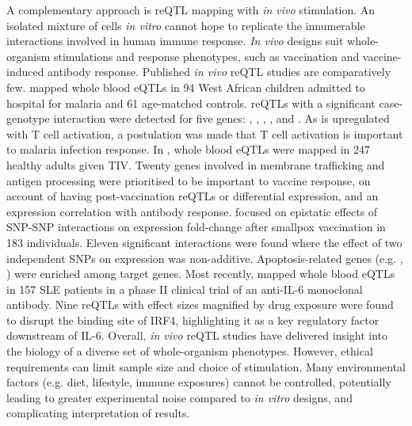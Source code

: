 A complementary approach is \gls{reQTL} mapping with \textit{in vivo} stimulation.
An isolated mixture of cells \textit{in vitro} cannot hope to replicate the innumerable interactions involved in human immune response.
\textit{In vivo} designs suit whole-organism stimulations and response phenotypes,
such as vaccination and vaccine-induced antibody response.
%
Published \textit{in vivo} \gls{reQTL} studies are comparatively few.
\textcite{idaghdour2012EvidenceAdditiveInteraction} mapped whole blood \glspl{eQTL} in 94 West African children admitted to hospital for malaria and 61 age-matched controls.
\glspl{reQTL} with a significant case-genotype interaction were detected for five genes:
, , , , and .
As  is upregulated with T cell activation, a postulation was made that T cell activation is important to malaria infection response.
In \textcite{franco2013IntegrativeGenomicAnalysis}, whole blood \glspl{eQTL} were mapped in 247 healthy adults given \gls{TIV}.
Twenty genes involved in membrane trafficking and antigen processing were prioritised to be important to vaccine response,
on account of having post-vaccination \glspl{reQTL} or differential expression, and an expression correlation with antibody response.
\textcite{lareau2016InteractionQuantitativeTrait} focused on epistatic effects of \gls{SNP}-\gls{SNP} interactions on expression fold-change after smallpox vaccination in 183 individuals.
Eleven significant interactions were found where the effect of two independent \glspl{SNP} on expression was non-additive.
Apoptosis-related genes (e.g. , ) were enriched among target genes.
Most recently, \textcite{davenport2018DiscoveringVivoCytokineeQTL}
mapped whole blood \glspl{eQTL} in 157 \gls{SLE} patients in a phase II clinical trial of an anti-IL-6 monoclonal antibody.
Nine \glspl{reQTL} with effect sizes magnified by drug exposure were found to disrupt the binding site of IRF4,
highlighting it as a key regulatory factor downstream of IL-6.
%
Overall, \textit{in vivo} \gls{reQTL} studies have delivered insight into the biology of a diverse set of whole-organism phenotypes.
However, ethical requirements can limit sample size and choice of stimulation.
Many environmental factors (e.g. diet, lifestyle, immune exposures) cannot be controlled, 
potentially leading to greater experimental noise compared to \textit{in vitro} designs, and complicating interpretation of results.

